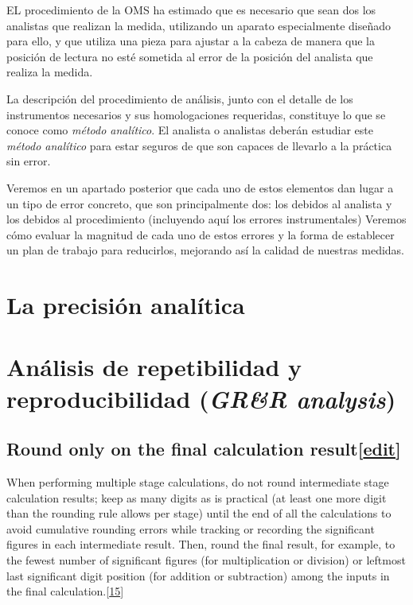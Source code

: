 \documentclass[
  letterpaper,
]{scrbook}
\begin{document}
EL procedimiento de la OMS ha estimado que es necesario que sean dos los
analistas que realizan la medida, utilizando un aparato especialmente
diseñado para ello, y que utiliza una pieza para ajustar a la cabeza de
manera que la posición de lectura no esté sometida al error de la
posición del analista que realiza la medida.

La descripción del procedimiento de análisis, junto con el detalle de
los instrumentos necesarios y sus homologaciones requeridas, constituye
lo que se conoce como \emph{método analítico}. El analista o analistas
deberán estudiar este \emph{método analítico} para estar seguros de que
son capaces de llevarlo a la práctica sin error.

Veremos en un apartado posterior que cada uno de estos elementos dan
lugar a un tipo de error concreto, que son principalmente dos: los
debidos al analista y los debidos al procedimiento (incluyendo aquí los
errores instrumentales) Veremos cómo evaluar la magnitud de cada uno de
estos errores y la forma de establecer un plan de trabajo para
reducirlos, mejorando así la calidad de nuestras medidas.

\hypertarget{la-precisiuxf3n-analuxedtica}{%
\section{La precisión analítica}\label{la-precisiuxf3n-analuxedtica}}

\hypertarget{anuxe1lisis-de-repetibilidad-y-reproducibilidad-grr-analysis}{%
\section{\texorpdfstring{Análisis de repetibilidad y reproducibilidad
(\emph{GR\&R
analysis})}{Análisis de repetibilidad y reproducibilidad (GR\&R analysis)}}\label{anuxe1lisis-de-repetibilidad-y-reproducibilidad-grr-analysis}}

\hypertarget{round-only-on-the-final-calculation-resultedit}{%
\subsection{\texorpdfstring{Round only on the final calculation
result{[}\href{https://en.wikipedia.org/w/index.php?title=Significant_figures\&action=edit\&section=14}{edit}{]}}{Round only on the final calculation result{[}edit{]}}}\label{round-only-on-the-final-calculation-resultedit}}

When performing multiple stage calculations, do not round intermediate
stage calculation results; keep as many digits as is practical (at least
one more digit than the rounding rule allows per stage) until the end of
all the calculations to avoid cumulative rounding errors while tracking
or recording the significant figures in each intermediate result. Then,
round the final result, for example, to the fewest number of significant
figures (for multiplication or division) or leftmost last significant
digit position (for addition or subtraction) among the inputs in the
final
calculation.{[}\href{https://en.wikipedia.org/wiki/Significant_figures\#cite_note-15}{15{]}}
\end{document}
